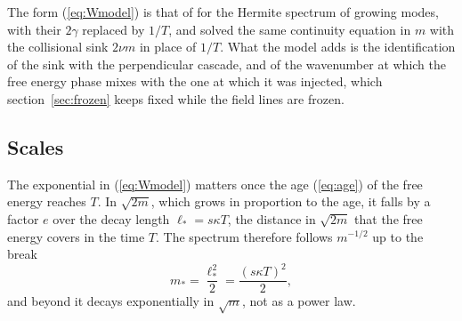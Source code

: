 The form (\ref{eq:Wmodel}) is that of \citet[eq.~112]{ZoccoSchekochihin2011} for the Hermite spectrum of growing modes, with their $2\gamma$ replaced by $1/T$, and \citet[eqs~2.58--2.59]{Schekochihin2016} solved the same continuity equation in $m$ with the collisional sink $2\nu m$ in place of $1/T$. What the model adds is the identification of the sink with the perpendicular cascade, and of the wavenumber at which the free energy phase mixes with the one at which it was injected, which section~\ref{sec:frozen} keeps fixed while the field lines are frozen.

\subsection{Scales}\label{tc:scales}

The exponential in (\ref{eq:Wmodel}) matters once the age (\ref{eq:age}) of the free energy reaches $T$. In $\sqrt{2m}$, which grows in proportion to the age, it falls by a factor $e$ over the decay length $\ell_*=s\kappa T$, the distance in $\sqrt{2m}$ that the free energy covers in the time $T$. The spectrum therefore follows $m^{-1/2}$ up to the break
\begin{equation}\label{eq:mstar}
  m_*=\frac{\ell_*^2}{2}=\frac{(s\kappa T)^2}{2},
\end{equation}
and beyond it decays exponentially in $\sqrt m$, not as a power law.

